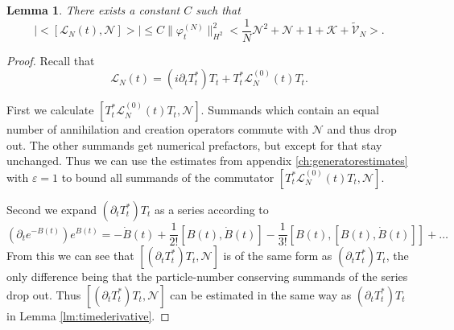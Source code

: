 \documentclass[11pt,a4paper,draft,DIV11]{scrartcl}	%
\newtheorem{lem}[thm]{Lemma}
\newcommand{\Lcal}{\mathcal{L}}		%
\newcommand{\Ncal}{\mathcal{N}}		%
\newcommand{\Kcal}{\mathcal{K}}		%
\newcommand{\tilV}{\tilde{\mathcal{V}}_N}		%
\newcommand{\hc}{\mbox{h.c.}}		%
\newcommand{\norm}[1]{\lVert#1\rVert}	%
\newcommand{\ev}[1]{\big<#1\big>}	%
\newcommand{\ph}{\varphi_t^{(N)}}	%
\newcommand{\bd}{\begin{displaymath}}			%
\newcommand{\ed}{\end{displaymath}}
\begin{document}
\begin{lem}
\label{lem:lncommutatorbound}
There exists a constant $C$ such that
 \bd
  \lvert \ev{[\Lcal_N(t),\Ncal]} \rvert \leq C \norm{\ph}_{H^2}^2 \ev{\frac{1}{N}\Ncal^2 + \Ncal + 1 + \Kcal + \tilV}.
 \ed
\end{lem}
\begin{proof}
Recall that
\[\Lcal_N(t) = (i \partial_t T^\ast_t)T_t + T^\ast_t \Lcal_N^{(0)}(t)T_t.\]

First we calculate $[T^\ast_t \Lcal_N^{(0)}(t)T_t,\Ncal]$. Summands which contain an equal number of annihilation and creation operators commute with $\Ncal$ and thus drop out. The other summands get numerical prefactors, but except for that stay unchanged. %
Thus we can use the estimates from appendix \ref{ch:generatorestimates}
with $\varepsilon = 1$ to bound all summands of the commutator $[T^\ast_t \Lcal_N^{(0)}(t)T_t,\Ncal]$.

Second we expand $(\partial_t T^\ast_t)T_t$ as a series according to
\bd
\left(\partial_t e^{-B(t)} \right) e^{B(t)} = - \dot B(t) +
\frac{1}{2!}[B(t),\dot B(t)] - \frac{1}{3!}[B(t),[B(t),\dot B(t)]] + \dots
\ed
From this we can see that $[(\partial_t T^\ast_t)T_t,\Ncal]$ is of the same form as $(\partial_t T^\ast_t)T_t$, the only difference being that the particle-number conserving summands of the series drop out. Thus  $[(\partial_t T^\ast_t)T_t,\Ncal]$ can be estimated in the same way as $(\partial_t T^\ast_t)T_t$ in Lemma \ref{lm:timederivative}.
\end{proof}
\end{document}
